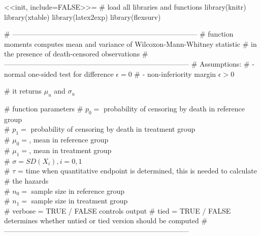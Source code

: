 \documentclass[bimj,fleqn]{w-art}
\theoremstyle{plain}
\theoremstyle{definition}
\begin{document}

<<init, include=FALSE>>=
# load all libraries and functions
library(knitr)
library(xtable)
library(latex2exp)
library(flexsurv)



# ------------------------------------------------------------------------------
# function moments computes mean and variance of Wilcoxon-Mann-Whitney statistic
# in the presence of death-censored observations
# ------------------------------------------------------------------------------
# Assumptions:
# - normal one-sided test for difference $\epsilon = 0$
# - non-inferiority margin $\epsilon > 0$

# it returns $\mu_u$ and $\sigma_u$

# function parameters
# $p_0 = $ probability of censoring by death in reference group \\
# $p_1 = $ probability of censoring by death in treatment group\\
# $\mu_0 = $, mean in reference group \\
# $\mu_1 = $, mean in treatment group \\
# $\sigma =  SD(X_i), i=0, 1$ \\
# $\tau$ = time when quantitative endpoint is determined, this is needed to calculate
# the hazards \\
# $n_0 = $ sample size in reference group \\
# $n_1 = $ sample size in treatment group \\
# verbose = TRUE / FALSE controls output
# tied = TRUE / FALSE determines whether untied or tied version should be computed
# ------------------------------------------------------------------------------
\end{document}
